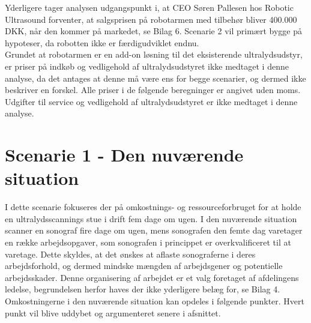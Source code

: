 Yderligere tager analysen udgangspunkt i, at CEO Søren Pallesen hos Robotic Ultrasound forventer, at salgsprisen på robotarmen med tilbehør bliver 400.000 DKK, når den kommer på markedet, se Bilag 6. Scenarie 2 vil primært bygge på hypoteser, da robotten ikke er færdigudviklet endnu. \\
Grundet at robotarmen er en add-on løsning til det eksisterende ultralydsudstyr, er priser på indkøb og vedligehold af ultralydsudstyret ikke medtaget i denne analyse, da det antages at denne må være ens for begge scenarier, og dermed ikke beskriver en forskel. Alle priser i de følgende beregninger er angivet uden moms. Udgifter til service og vedligehold af ultralydsudstyret er ikke medtaget i denne analyse. 

\section{Scenarie 1 - Den nuværende situation} \label{nuvaerende}
I dette scenarie fokuseres der på omkostnings- og ressourceforbruget for at holde en ultralydsscannings stue i drift fem dage om ugen. I den nuværende situation scanner en sonograf fire dage om ugen, mens sonografen den femte dag varetager en række arbejdsopgaver, som sonografen i princippet er overkvalificeret til at varetage. Dette skyldes, at det ønskes at aflaste sonograferne i deres arbejdsforhold, og dermed mindske mængden af arbejdsgener og potentielle arbejdsskader. Denne organisering af arbejdet er et valg foretaget af afdelingens ledelse, begrundelsen herfor haves der ikke yderligere belæg for, se Bilag 4. \\ 
Omkostningerne i den nuværende situation kan opdeles i følgende punkter. Hvert punkt vil blive uddybet og argumenteret senere i afsnittet.

